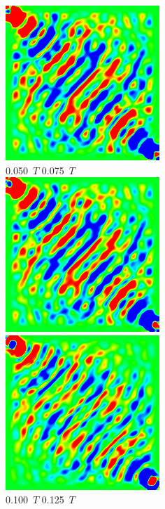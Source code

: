 \documentclass[a4j, twocolumn]{jsarticle}
\begin{document}
\begin{figure}
\includegraphics[width=0.4\hsize]{./figures/capture/sqr/sinsqr128_32i_l_dif_7063} \\
0.050\ $T$ \hspace*{0.25\hsize} 0.075\ $T$  \vspace{5pt}\\
\includegraphics[width=0.4\hsize]{./figures/capture/sqr/sinsqr128_32i_l_dif_7064} \ 
\includegraphics[width=0.4\hsize]{./figures/capture/sqr/sinsqr128_32i_l_dif_7066} \\
0.100\ $T$ \hspace*{0.25\hsize} 0.125\ $T$  \vspace{5pt}\\

\end{figure}
\end{document}
